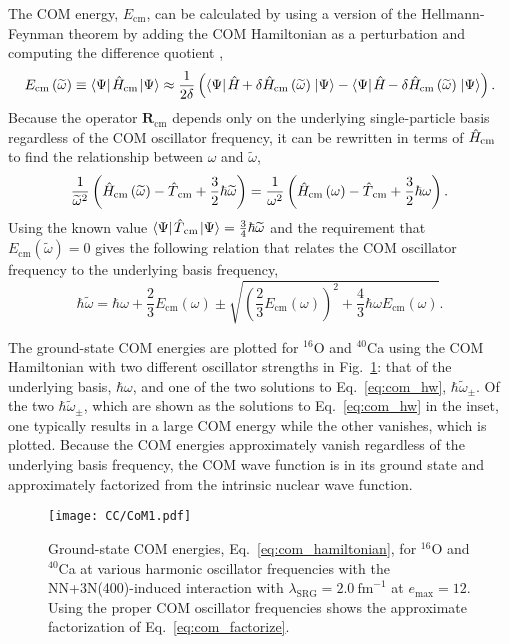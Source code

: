 \documentclass[thesis.tex]{subfiles}
\begin{document}
The COM energy, $E_{\mathrm{cm}}$, can be calculated by using a version of the Hellmann-Feynman theorem by adding the COM Hamiltonian as a perturbation and computing the difference quotient \cite{DIERCKSEN198129,ERNZERHOF199359},
\begin{equation} \label{eq:com_energy}
  E_{\mathrm{cm}}\left(\widetilde{\omega}\right) \equiv \langle \Psi |\hspace{1pt}\hat{H}\hspace{-1pt}_{\mathrm{cm}}\hspace{1pt}\lvert \Psi \rangle \approx \frac{1}{2\delta}\left(\langle \Psi |\hspace{1pt}\hat{H}\hspace{-1pt} + \delta\hat{H}\hspace{-1pt}_{\mathrm{cm}}\left(\widetilde{\omega}\right)\hspace{1pt}\lvert \Psi \rangle - \langle \Psi |\hspace{1pt}\hat{H}\hspace{-1pt} - \delta\hat{H}\hspace{-1pt}_{\mathrm{cm}}\left(\widetilde{\omega}\right)\hspace{1pt}\lvert \Psi \rangle\right).
\end{equation}
Because the operator $\mathbf{R}_{\mathrm{cm}}$ depends only on the underlying single-particle basis regardless of the COM oscillator frequency, it can be rewritten in terms of $\hat{H}\hspace{-1pt}_{\mathrm{cm}}$ to find the relationship between $\omega$ and $\widetilde{\omega}$,
\begin{equation}
  \frac{1}{\widetilde{\omega}^{2}}\left(\hat{H}\hspace{-1pt}_{\mathrm{cm}}\left(\widetilde{\omega}\right) - \hat{T}\hspace{-0.25pt}_{\mathrm{cm}} + \frac{3}{2}\hbar\widetilde{\omega}\right) = \frac{1}{\omega^{2}}\left(\hat{H}\hspace{-1pt}_{\mathrm{cm}}\left(\omega\right) - \hat{T}\hspace{-0.25pt}_{\mathrm{cm}} + \frac{3}{2}\hbar\omega\right).
\end{equation}
Using the known value $\langle \Psi |\hspace{1pt}\hat{T}\hspace{-0.25pt}_{\mathrm{cm}}\hspace{1pt}\lvert \Psi \rangle = \frac{3}{4}\hbar\widetilde{\omega}$ and the requirement that $E_{\mathrm{cm}}\left(\widetilde{\omega}\right)=0$ gives the following relation that relates the COM oscillator frequency to the underlying basis frequency,
\begin{equation} \label{eq:com_hw}
  \hbar\widetilde{\omega} = \hbar\omega + \frac{2}{3}E_{\mathrm{cm}}\left(\omega\right) \pm \sqrt{\left(\frac{2}{3}E_{\mathrm{cm}}\left(\omega\right)\right)^{2} + \frac{4}{3}\hbar\omega E_{\mathrm{cm}}\left(\omega\right)}.
\end{equation}

The ground-state COM energies are plotted for ${}^{16}$O and ${}^{40}$Ca using the COM Hamiltonian with two different oscillator strengths in Fig.\ \ref{fig:CoM_Ground_State}: that of the underlying basis, $\hbar\omega$, and one of the two solutions to Eq.\ \eqref{eq:com_hw}, $\hbar\widetilde{\omega}_{\pm}$.  Of the two $\hbar\widetilde{\omega}_{\pm}$, which are shown as the solutions to Eq.\ \eqref{eq:com_hw} in the inset, one typically results in a large COM energy while the other vanishes, which is plotted.  Because the COM energies approximately vanish regardless of the underlying basis frequency, the COM wave function is in its ground state and approximately factorized from the intrinsic nuclear wave function.
\begin{figure}[h]
  \centering
  \texttt{[image: CC/CoM1.pdf]}
  \caption{Ground-state COM energies, Eq.\ \eqref{eq:com_hamiltonian}, for ${}^{16}$O and ${}^{40}$Ca at various harmonic oscillator frequencies with the NN+3N(400)-induced interaction with $\lambda_{\mathrm{SRG}}=2.0\ \mathrm{fm}^{-1}$ at $e_{\mathrm{max}}=12$.  Using the proper COM oscillator frequencies shows the approximate factorization of Eq.\ \eqref{eq:com_factorize}.}
  \label{fig:CoM_Ground_State}
\end{figure}
\end{document}
